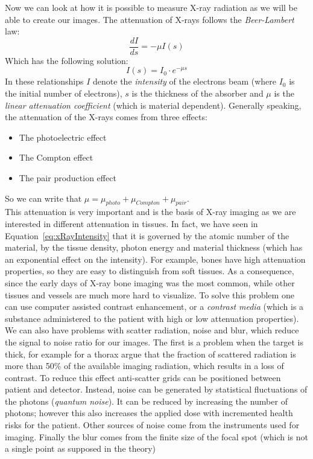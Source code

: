 Now we can look at how it is possible to measure X-ray radiation as we will be able to create our images.
The attenuation of X-rays follows the \textit{Beer-Lambert} law:
\begin{equation} \label{eq:xRayIntensity}
 \frac{dI}{ds} = -\mu I(s)
\end{equation}
Which has the following solution:
\begin{equation}
 I(s) = I_{0} \cdot e^{-\mu s}
\end{equation}
In these relationships $I$ denote the \textit{intensity} of the electrons beam (where $I_{0}$ is the initial number of electrons), $s$ is the thickness of the absorber and $\mu$ is the \textit{linear attenuation coefficient} (which is material dependent). Generally speaking, the attenuation of the X-rays comes from three effects:
\begin{itemize}
 \item The photoelectric effect
 \item The Compton effect
 \item The pair production effect
\end{itemize}
So we can write that $\mu = \mu_{photo} + \mu_{Compton} + \mu_{pair}$.\\

This attenuation is very important and is the basis of X-ray imaging as we are interested in different attenuation in tissues. In fact, we have seen in Equation~\ref{eq:xRayIntensity} that it is governed by the atomic number of the material, by the tissue density, photon energy and material thickness (which has an exponential effect on the intensity). For example, bones have high attenuation properties, so they are easy to distinguish from soft tissues. As a consequence, since the early days of X-ray bone imaging was the most common, while other tissues and vessels are much more hard to visualize. To solve this problem one can use computer assisted contrast enhancement, or a \textit{contrast media} (which is a substance administered to the patient with high or low attenuation properties). We can also have problems with scatter radiation, noise and blur, which reduce the signal to noise ratio for our images. The first is a problem when the target is thick, for example for a thorax \cite{Birkfellner} argue that the fraction of scattered radiation is more than 50\% of the available imaging radiation, which results in a loss of contrast. To reduce this effect anti-scatter grids can be positioned between patient and detector. Instead, noise can be generated by statistical fluctuations of the photons (\textit{quantum noise}). It can be reduced by increasing the number of photons; however this also increases the applied dose with incremented health risks for the patient. Other sources of noise come from the instruments used for imaging. Finally the blur comes from the finite size of the focal spot (which is not a single point as supposed in the theory)

